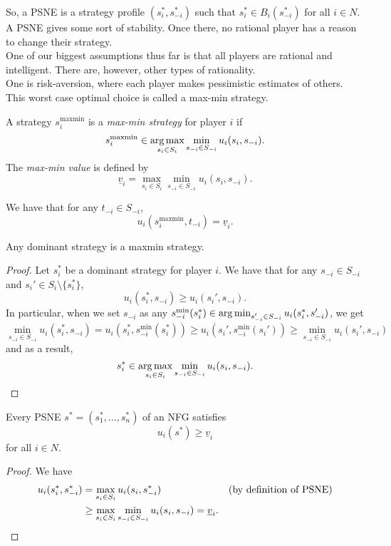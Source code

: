 	So, a PSNE is a strategy profile $(s_i^*,s_{-i}^*)$ such that $s_i^* \in B_i(s_{-i}^*)$ for all $i \in N$.\\
	A PSNE gives some sort of stability. Once there, no rational player has a reason to change their strategy.\\

	One of our biggest assumptions thus far is that all players are rational and intelligent. There are, however, other types of rationality.\\
	One is risk-aversion, where each player makes pessimistic estimates of others. This worst case optimal choice is called a max-min strategy.

	\begin{fdef}
		A strategy $s_i^\text{maxmin}$ is a \emph{max-min strategy} for player $i$ if
		\[ s_i^{\text{maxmin}} \in \operatorname*{arg\,max}_{s_i \in S_i} \min_{s_{-i} \in S_{-i}} u_i(s_i,s_{-i}). \]
		The \emph{max-min value} is defined by
		\[ \underline{v}_{i} = \max_{s_i \in S_i} \min_{s_{-i} \in S_{-i}} u_i(s_i,s_{-i}). \]
	\end{fdef}

	We have that for any $t_{-i} \in S_{-i}$,
	\[ u_i(s_i^\text{maxmin}, t_{-i}) = \underline{v}_i. \]

	\begin{ftheo}
		Any dominant strategy is a maxmin strategy.
	\end{ftheo}
	\begin{proof}
		Let $s_i^*$ be a dominant strategy for player $i$. We have that for any $s_{-i} \in S_{-i}$ and $s_i' \in S_i \setminus \{s_i^*\}$,
		\[ u_i(s_i^*, s_{-i}) \ge u_i(s_i', s_{-i}). \]
		In particular, when we set $s_{-i}$ as any $s_{-i}^\text{min}(s_i^*) \in \operatorname*{arg\,min}_{s_{-i}' \in S_{-i}} u_i(s_i^*,s_{-i}')$, we get
		\[ \min_{s_{-i} \in S_{-i}} u_i(s_i^*, s_{-i}) = u_i(s_i^*, s_{-i}^\text{min}(s_i^*)) \ge u_i(s_i', s_{-i}^\text{min}(s_i')) \ge \min_{s_{-i} \in S_{-i}} u_i(s_i', s_{-i}) \]
		and as a result,
		\[ s_i^* \in \operatorname*{arg\,max}_{s_i \in S_i} \min_{s_{-i} \in S_{-i}} u_i(s_i,s_{-i}). \qedhere \]
	\end{proof}

	\begin{ftheo}
		Every PSNE $s^* = (s_1^*,\ldots,s_n^*)$ of an NFG satisfies
		\[ u_i(s^*) \ge \underline{v}_i \]
		for all $i \in N$.
	\end{ftheo}
	\begin{proof}
		We have
		\begin{align*}
			u_i(s_i^*, s_{-i}^*) &= \max_{s_i \in S_i} u_i(s_i, s_{-i}^*) & \text{(by definition of PSNE)} \\
				&\ge \max_{s_i \in S_i} \min_{s_{-i} \in S_{-i}} u_i(s_i, s_{-i}) = \underline{v}_i. \qedhere
		\end{align*}
	\end{proof}

